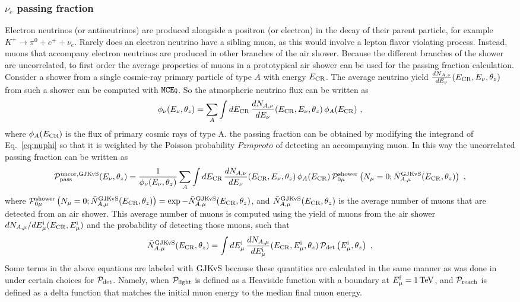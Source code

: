 \subsubsection{$\nu_e$ passing fraction}
Electron neutrinos (or antineutrinos) are produced alongside a positron (or electron) in the decay of their parent particle, for example $K^+ \rightarrow \pi^0 + e^+ + \nu_e$.
Rarely does an electron neutrino have a sibling muon, as this would involve a lepton flavor violating process.
Instead, muons that accompany electron neutrinos are produced in other branches of the air shower.
Because the different branches of the shower are uncorrelated, to first order the average properties of muons in a prototypical air shower can be used for the passing fraction calculation.
Consider a shower from a single cosmic-ray primary particle of type $A$ with energy $E_{\rm CR}$.
The average neutrino yield $\frac{dN_{A, \nu}}{dE_\nu}(E_{\rm CR}, E_\nu, \theta_z)$ from such a shower can be computed with $\texttt{MCE{\scriptsize Q}}$.
So the atmospheric neutrino flux can be written as 
\begin{equation}
\label{eq:nuphi}
\phi_\nu(E_\nu, \theta_z)  = \sum_A \int dE_{\rm CR} \, \frac{dN_{A, \nu}}{dE_\nu}(E_{\rm CR}, E_\nu, \theta_z) \, \phi_A(E_{\rm CR})~,
\end{equation}
where $\phi_A(E_{\rm CR})$ is the flux of primary cosmic rays of type A.
the passing fraction can be obtained by modifying the integrand of Eq.~\ref{eq:nuphi} so that it is weighted by the Poisson probability $Pzmproto$ of detecting an accompanying muon.
In this way the uncorrelated passing fraction can be written as
\begin{equation}
\label{eq:PuncorGJKvS}
{\cal P}_{\rm pass}^{\rm uncor, GJKvS}(E_\nu, \theta_z)  =  \frac{1}{\phi_\nu(E_\nu, \theta_z)} \sum_A \int dE_{\rm CR} \, \frac{dN_{A, \nu}}{dE_\nu}(E_{\rm CR}, E_\nu, \theta_z) \, \phi_A(E_{\rm CR}) \, {\cal P}_{0\mu}^{\rm shower} \left(N_\mu = 0  ; \bar N_{A, \mu}^{\rm GJKvS}(E_{\rm CR}, \theta_z)\right)~,
\end{equation}
where ${\cal P}_{0\mu}^{\rm shower} \left(N_\mu = 0  ; \bar N_{A, \mu}^{\rm GJKvS}(E_{\rm CR}, \theta_z)\right) = \exp{-\bar N_{A, \mu}^{\rm GJKvS}(E_{\rm CR}, \theta_z)}$,
and  $\bar N_{A, \mu}^{\rm GJKvS}(E_{\rm CR}, \theta_z)$ is the average number of muons that are detected from an air shower.
This average number of muons is computed using the yield of muons from the air shower $dN_{A, \mu}/dE_{\mu}^{\rm i}(E_{\rm CR}, E_{\mu}^{\rm i})$ and the probability of detecting those muons, such that
\begin{equation}
\label{eq:Nmu}
\bar N_{A, \mu}^{\rm GJKvS}(E_{\rm CR},\theta_z) = \int dE_{\mu}^{\rm i} \, \frac{dN_{A, \mu}}{dE_{\mu}^{\rm i}}(E_{\rm CR}, E_{\mu}^{\rm i},  \theta_z) \, {\cal P}_{\rm det}\left(E_{\mu}^{\rm i} , \theta_z\right) ~,
\end{equation}
Some terms in the above equations are labeled with ${\rm GJKvS}$ because these quantities are calculated in the same manner as was done in~\cite{Gaisser:2014bja} under certain choices for ${\cal P}_{\rm det}$.
Namely, when ${\cal P}_{\rm light}$ is defined as a Heaviside function with a boundary at $\Emf = \SI{1}\TeV$, and ${\cal P}_{\rm reach}$ is defined as a delta function that matches the initial muon energy to the median final muon energy.

